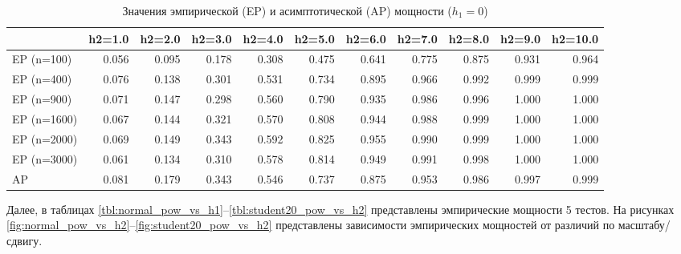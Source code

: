 \documentclass[12pt]{article}
\theoremstyle{break}
\begin{document}
\begin{table}[!h]
	\caption{Значения эмпирической (EP) и асимптотической (AP) мощности ($h_1=0$)}
	\centering
	\hspace*{-1.0cm}\begin{tabular}
		{lrrrrrrrrrr}
		\toprule
		& h2=1.0 & h2=2.0 & h2=3.0 & h2=4.0 & h2=5.0 & h2=6.0 & h2=7.0 & h2=8.0 & h2=9.0 & h2=10.0\\
		\midrule
		EP (n=100) & 0.056 & 0.095 & 0.178 & 0.308 & 0.475 & 0.641 & 0.775 & 0.875 & 0.931 & 0.964\\
		EP (n=400) & 0.076 & 0.138 & 0.301 & 0.531 & 0.734 & 0.895 & 0.966 & 0.992 & 0.999 & 0.999\\
		EP (n=900) & 0.071 & 0.147 & 0.298 & 0.560 & 0.790 & 0.935 & 0.986 & 0.996 & 1.000 & 1.000\\
		EP (n=1600) & 0.067 & 0.144 & 0.321 & 0.570 & 0.808 & 0.944 & 0.988 & 0.999 & 1.000 & 1.000\\
		EP (n=2000) & 0.069 & 0.149 & 0.343 & 0.592 & 0.825 & 0.955 & 0.990 & 0.999 & 1.000 & 1.000\\
		
		EP (n=3000) & 0.061 & 0.134 & 0.310 & 0.578 & 0.814 & 0.949 & 0.991 & 0.998 & 1.000 & 1.000\\
		\addlinespace
		AP & 0.081 & 0.179 & 0.343 & 0.546 & 0.737 & 0.875 & 0.953 & 0.986 & 0.997 & 0.999\\
		\bottomrule
	\end{tabular}
	\label{tbl:ap_student20_h2_diff}
\end{table}



\vspace{0.6in}

Далее, в таблицах \ref{tbl:normal_pow_vs_h1}--\ref{tbl:student20_pow_vs_h2} представлены эмпирические мощности 5 тестов. На рисунках \ref{fig:normal_pow_vs_h2}--\ref{fig:student20_pow_vs_h2} представлены зависимости эмпирических мощностей от различий по масштабу/сдвигу.\\
\newpage
\end{document}
